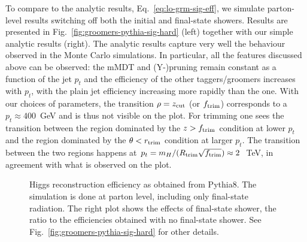 To compare to the analytic results, Eq.~\eqref{eq:lo-grm-sig-eff}, we
simulate parton-level results switching off both the initial and
final-state showers.
%
Results are presented in Fig.~\ref{fig:groomers-pythia-sig-hard}
(left) together with our simple analytic results (right).
%
The analytic results capture very well the behaviour
observed in the Monte Carlo simulations. In particular, all the
features discussed above can be observed: the mMDT and (Y-)pruning
remain constant as a function of the jet $p_t$ and the efficiency of
the other taggers/groomers increases with $p_t$, with the plain jet
efficiency increasing more rapidly than the \SD one.
%
With our choices of parameters, the transition $\rho=z_{\text{cut}}$ (or
$f_{\text{trim}}$) corresponds to a $p_t\approx 400$~GeV and is thus not
visible on the plot.
%
For trimming one sees the transition between the region dominated by
the $z>f_{\text{trim}}$ condition at lower $p_t$ and the region dominated by
the $\theta<r_{\text{trim}}$ condition at larger $p_t$. The transition between
the two regions happens at
$p_t=m_H/(R_\text{trim}\sqrt{f_{\text{trim}}})\approx 2$~TeV, in agreement with
what is observed on the plot.


\begin{figure}[t!]
  \hfill%
  \caption{Higgs reconstruction efficiency as obtained from
    Pythia8. The simulation is done at parton level, including only
    final-state radiation. The right plot shows the effects of
    final-state shower, \ie the ratio to the efficiencies obtained
    with no final-state shower. See
    Fig.~\ref{fig:groomers-pythia-sig-hard} for other
    details.}\label{fig:groomers-pythia-sig-fsr}
\end{figure}


